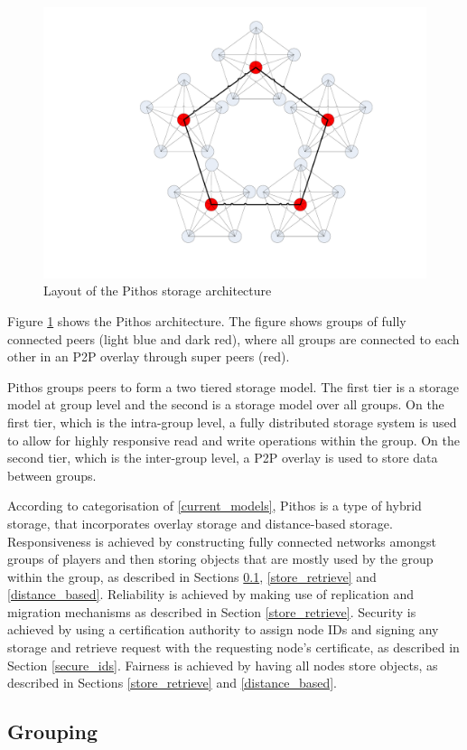\documentclass[10pt,a4paper,conference]{IEEEtran}
\begin{document}
\begin{figure}[htbp]
 \centering
 \includegraphics[clip=true, viewport=7.5cm 2.5cm 26cm 20cm, width=0.7\columnwidth]{CDHT_layout}
 \caption{Layout of the Pithos storage architecture}
 \label{fig_pithos}
\end{figure}
%
Figure \ref{fig_pithos} shows the Pithos architecture. The figure shows groups of fully connected peers (light blue and dark red), where all groups
are connected to each other in an P2P overlay through super peers (red).

Pithos groups peers to form a two tiered storage model. The first tier is a storage model at group level and the second is a storage model over all
groups. On the first tier, which is the intra-group level, a fully distributed storage system is used to allow for highly responsive read and write
operations within the group. On the second tier, which is the inter-group level, a P2P overlay is used to store data between groups.

According to categorisation of \ref{current_models}, Pithos is a type of hybrid storage, that incorporates overlay storage and distance-based
storage. Responsiveness is achieved by constructing fully connected networks amongst groups of players and then storing objects that are mostly used
by the group within the group, as described in Sections \ref{grouping}, \ref{store_retrieve} and \ref{distance_based}. Reliability is achieved by
making use of replication and migration mechanisms as described in Section \ref{store_retrieve}. Security is achieved by using a certification
authority to assign node IDs and signing any storage and retrieve request with the requesting node's certificate, as described in Section
\ref{secure_ids}. Fairness is achieved by having all nodes store objects, as described in Sections \ref{store_retrieve} and \ref{distance_based}.

\subsection{Grouping}
\label{grouping}
\end{document}
